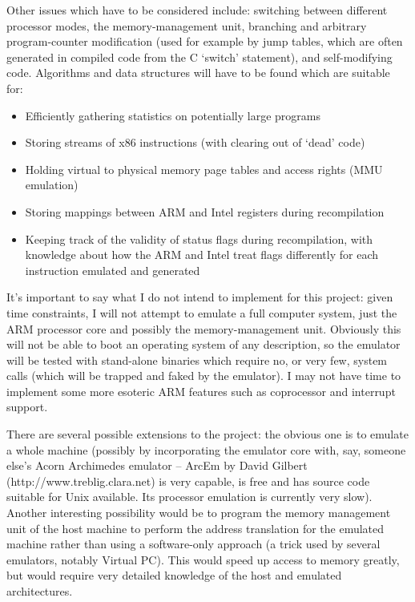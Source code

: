 Other issues which have to be considered include: switching between different processor modes, the memory-management unit, branching and arbitrary program-counter modification (used for example by jump tables, which are often generated in compiled code from the C `switch' statement), and self-modifying code. Algorithms and data structures will have to be found which are suitable for:

\begin{itemize}

\item Efficiently gathering statistics on potentially large programs
\item Storing streams of x86 instructions (with clearing out of `dead' code)
\item Holding virtual to physical memory page tables and access rights (MMU emulation)
\item Storing mappings between ARM and Intel registers during recompilation
\item Keeping track of the validity of status flags during recompilation, with knowledge about how the ARM and Intel treat flags differently for each instruction emulated and generated

\end{itemize}

It's important to say what I do not intend to implement for this project: given time constraints, I will not attempt to emulate a full computer system, just the ARM processor core and possibly the memory-management unit. Obviously this will not be able to boot an operating system of any description, so the emulator will be tested with stand-alone binaries which require no, or very few, system calls (which will be trapped and faked by the emulator). I may not have time to implement some more esoteric ARM features such as coprocessor and interrupt support.

There are several possible extensions to the project: the obvious one is to emulate a whole machine (possibly by incorporating the emulator core with, say, someone else's Acorn Archimedes emulator -- ArcEm by David Gilbert (http://www.treblig.clara.net) is very capable, is free and has source code suitable for Unix available. Its processor emulation is currently very slow). Another interesting possibility would be to program the memory management unit of the host machine to perform the address translation for the emulated machine rather than using a software-only approach (a trick used by several emulators, notably Virtual PC). This would speed up access to memory greatly, but would require very detailed knowledge of the host and emulated architectures.

